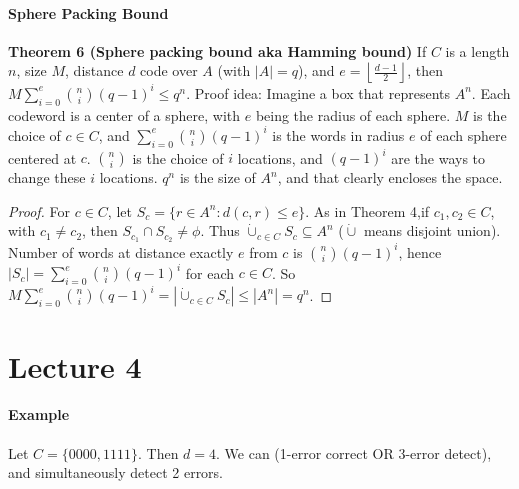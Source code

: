 \documentclass[10pt,letter]{article}
\theoremstyle{plain}
\theoremstyle{definition}
\begin{document}
\paragraph{Sphere Packing Bound}
\textbf{Theorem 6 (Sphere packing bound aka Hamming bound)}
If $C$ is a length $n$, size $M$, distance $d$ code over $A$ (with $|A|=q$), and $e=\left\lfloor\frac{d-1}{2}\right\rfloor$, then $M\sum_{i=0}^e{n\choose i}(q-1)^i\leq q^n$. Proof idea: Imagine a box that represents $A^n$. Each codeword is a center of a sphere, with $e$ being the radius of each sphere. $M$ is the choice of $c\in C$, and $\sum_{i=0}^e{n\choose i}(q-1)^i$ is the words in radius $e$ of each sphere centered at $c$. ${n\choose i}$ is the choice of $i$ locations, and $(q-1)^i$ are the ways to change these $i$ locations. $q^n$ is the size of $A^n$, and that clearly encloses the space.  
\begin{proof}
     For $c\in C$, let $S_c=\{r\in A^n:d(c,r)\leq e\}$. As in Theorem 4,if $c_1,c_2\in C$, with $c_1\neq c_2$, then $S_{c_1}\cap S_{c_2}\neq\phi$. Thus $\dot{\cup}_{c\in C}S_c\subseteq A^n$ ($\dot{\cup}$ means disjoint union). Number of words at distance exactly $e$ from $c$ is ${n\choose i}(q-1)^i$, hence $|S_c|=\sum_{i=0}^e{n\choose i}(q-1)^i$ for each $c\in C$. So $M\sum_{i=0}^e{n\choose i}(q-1)^i=\left|\dot{\cup}_{c\in C}S_c\right|\leq |A^n|=q^n$. 
\end{proof}

\section*{Lecture 4}
\paragraph{Example}
Let $C=\{0000,1111\}$. Then $d=4$. We can (1-error correct OR 3-error detect), and simultaneously detect 2 errors. 
\end{document}

